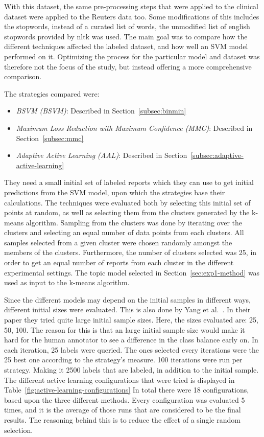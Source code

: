 With this dataset, the same pre-processing steps that were applied to the clinical dataset were applied to the Reuters data too.
Some modifications of this includes the stopwords, instead of a curated list of words, the unmodified list of english stopwords provided by nltk was used.
The main goal was to compare how the different techniques affected the labeled dataset, and how well an SVM model performed on it.
Optimizing the process for the particular model and dataset was therefore not the focus of the study, but instead offering a more comprehensive comparison.

The strategies compared were: 
\begin{itemize}
    \item \textit{BSVM (BSVM)}: Described in Section~\ref{subsec:binmin}
    \item \textit{Maximum Loss Reduction with Maximum Confidence (MMC)}: Described in Section~\ref{subsec:mmc}
    \item \textit{Adaptive Active Learning (AAL)}: Described in Section~\ref{subsec:adaptive-active-learning}
\end{itemize}
They need a small initial set of labeled reports which they can use to get initial predictions from the SVM model, upon which the strategies base their calculations.
The techniques were evaluated both by selecting this initial set of points at random, as well as selecting them from the clusters generated by the k-means algorithm.
Sampling from the clusters was done by iterating over the clusters and selecting an equal number of data points from each clusters.
All samples selected from a given cluster were chosen randomly amongst the members of the clusters.
Furthermore, the number of clusters selected was 25, in order to get an equal number of reports from each cluster in the different experimental settings.
The topic model selected in Section~\ref{sec:exp1-method} was used as input to the k-means algorithm.

Since the different models may depend on the initial samples in different ways, different initial sizes were evaluated.
This is also done by Yang et al\@.~\cite{yang2009effective}.
In their paper they tried quite large initial sample sizes.
Here, the sizes evaluated are: 25, 50, 100.
The reason for this is that an large initial sample size would make it hard for the human annotator to see a difference in the class balance early on.
In each iteration, 25 labels were queried.
The ones selected every iterations were the 25 best one according to the strategy's measure.
100 iterations were run per strategy.
Making it 2500 labels that are labeled, in addition to the initial sample.
The different active learning configurations that were tried is displayed in Table~\ref{fig:active-learning-configurations}
In total there were 18 configurations, based upon the three different methods.
Every configuration was evaluated 5 times, and it is the average of those runs that are considered to be the final results.
The reasoning behind this is to reduce the effect of a single random selection.

